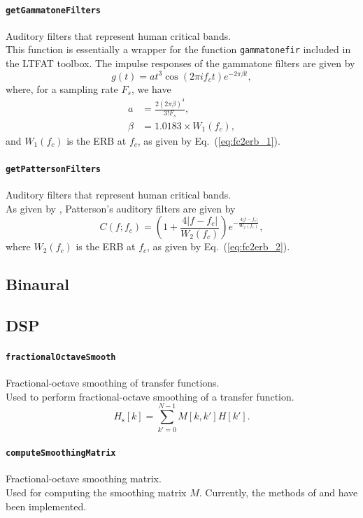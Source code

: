\documentclass[11pt, oneside]{article}
\newcommand{\eqnref}[1]{Eq.~(\ref{#1})}
\newcommand{\function}[1]{\paragraph*{\texttt{#1}}}
\begin{document}
\function{getGammatoneFilters} Auditory filters that represent human critical bands. \\
This function is essentially a wrapper for the function \texttt{gammatonefir} included in the LTFAT toolbox.
The impulse responses of the gammatone filters are given by
\begin{equation}
g(t) = a t^3 \cos(2 \pi i f_c t) e^{-2 \pi \beta t},
\end{equation}
where, for a sampling rate $F_s$, we have
\begin{equation}
\begin{aligned}
a &= \frac{2 (2 \pi \beta)^4}{3! F_s}, \\
\beta &= 1.0183 \times W_1(f_c),
\end{aligned}
\end{equation}
and $W_1(f_c)$ is the ERB at $f_c$, as given by \eqnref{eq:fc2erb_1}. %

\function{getPattersonFilters} Auditory filters that represent human critical bands. \\
As given by \citet[Eq.~(5.9)]{Salomons1995PhD}, Patterson's auditory filters are given by
\begin{equation}
C(f;f_c) = \left( 1 + \frac{4|f-f_c|}{W_2(f_c)} \right) e^{-\frac{4|f-f_c|}{W_2(f_c)}},
\end{equation}
where $W_2(f_c)$ is the ERB at $f_c$, as given by \eqnref{eq:fc2erb_2}.

\subsection{Binaural}

\subsection{DSP}

\function{fractionalOctaveSmooth} Fractional-octave smoothing of transfer functions. \\
Used to perform fractional-octave smoothing of a transfer function.
\begin{equation}\label{eq:fractionalOctaveSmooth}
H_\text{s}[k] = \sum_{k' = 0}^{N - 1} M[k, k'] H[k'].
\end{equation}

\function{computeSmoothingMatrix} Fractional-octave smoothing matrix. \\
Used for computing the smoothing matrix $M$.
Currently, the methods of \citet{HatziantoniouMourjopoulos2000} and \citet{Tylka2017} have been implemented.
\end{document}
